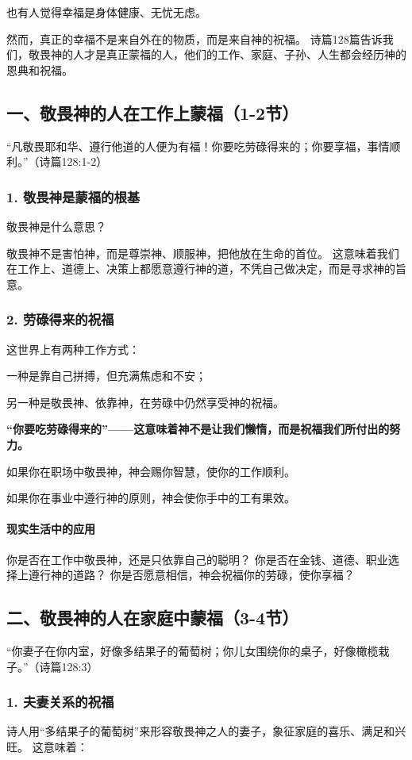 \documentclass[a4paper, 12pt]{article}
\begin{document}
也有人觉得幸福是身体健康、无忧无虑。

然而，真正的幸福不是来自外在的物质，而是来自神的祝福。 诗篇128篇告诉我们，敬畏神的人才是真正蒙福的人，他们的工作、家庭、子孙、人生都会经历神的恩典和祝福。

\subsection*{一、敬畏神的人在工作上蒙福（1-2节）}
“凡敬畏耶和华、遵行他道的人便为有福！你要吃劳碌得来的；你要享福，事情顺利。”（诗篇128:1-2）

\subsubsection*{1. 敬畏神是蒙福的根基}
敬畏神是什么意思？

敬畏神不是害怕神，而是尊崇神、顺服神，把他放在生命的首位。
这意味着我们在工作上、道德上、决策上都愿意遵行神的道，不凭自己做决定，而是寻求神的旨意。
\subsubsection*{2. 劳碌得来的祝福}
这世界上有两种工作方式：

一种是靠自己拼搏，但充满焦虑和不安；

另一种是敬畏神、依靠神，在劳碌中仍然享受神的祝福。

\textbf{“你要吃劳碌得来的”——这意味着神不是让我们懒惰，而是祝福我们所付出的努力。}

如果你在职场中敬畏神，神会赐你智慧，使你的工作顺利。

如果你在事业中遵行神的原则，神会使你手中的工有果效。
\paragraph*{现实生活中的应用}

你是否在工作中敬畏神，还是只依靠自己的聪明？
你是否在金钱、道德、职业选择上遵行神的道路？
你是否愿意相信，神会祝福你的劳碌，使你享福？
\subsection*{二、敬畏神的人在家庭中蒙福（3-4节）}
“你妻子在你内室，好像多结果子的葡萄树；你儿女围绕你的桌子，好像橄榄栽子。”（诗篇128:3）

\subsubsection*{1. 夫妻关系的祝福}
诗人用“多结果子的葡萄树”来形容敬畏神之人的妻子，象征家庭的喜乐、满足和兴旺。
这意味着：
\end{document}
